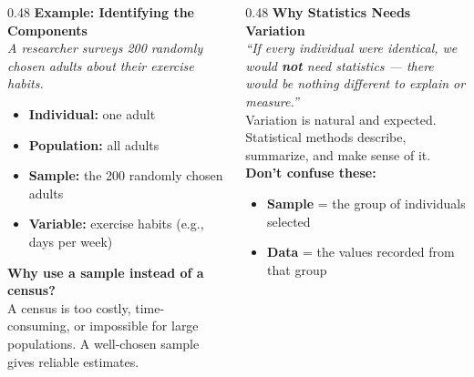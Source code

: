 \documentclass[aspectratio=169, 11pt]{beamer}
\begin{document}
{
\begin{frame}[t, plain]
  \hspace{0.4cm}%
  \begin{minipage}{0.93\textwidth}
    \vspace{0.3cm}
    \begin{columns}[T]

      \vspace{1em}
      \begin{column}{0.48\textwidth}
        \small
        \textbf{\color{navy}Example: Identifying the Components}\\[4pt]
        {\color{slate}\itshape A researcher surveys 200 randomly chosen
          adults about their exercise habits.}\\[6pt]
        \begin{itemize}
          \setlength{\itemsep}{0.3em}\setlength{\topsep}{0em}
          \item \textbf{Individual:}\; one adult
          \item \textbf{Population:}\; all adults
          \item \textbf{Sample:}\; the 200 randomly chosen adults
          \item \textbf{Variable:}\; exercise habits (e.g., days per week)
        \end{itemize}
        \vspace{6pt}
        \textbf{\color{navy}Why use a sample instead of a census?}\\[3pt]
        A census is too costly, time-consuming, or impossible for large
        populations. A well-chosen sample gives reliable estimates.
      \end{column}

      \begin{column}{0.48\textwidth}
        \small
        \textbf{\color{navy}Why Statistics Needs Variation}\\[4pt]
        {\itshape ``If every individual were identical, we would
        \textbf{not} need statistics --- there would be nothing different
        to explain or measure.''}\\[6pt]
        Variation is natural and expected. Statistical methods describe,
        summarize, and make sense of it.\\[8pt]
        \textbf{\color{navy}Don't confuse these:}
        \begin{itemize}
          \setlength{\itemsep}{0.3em}\setlength{\topsep}{3pt}
          \item \textbf{Sample} = the group of individuals selected
          \item \textbf{Data} = the values recorded from that group
        \end{itemize}
      \end{column}


\end{columns}
\end{minipage}
\end{frame}}
\end{document}
